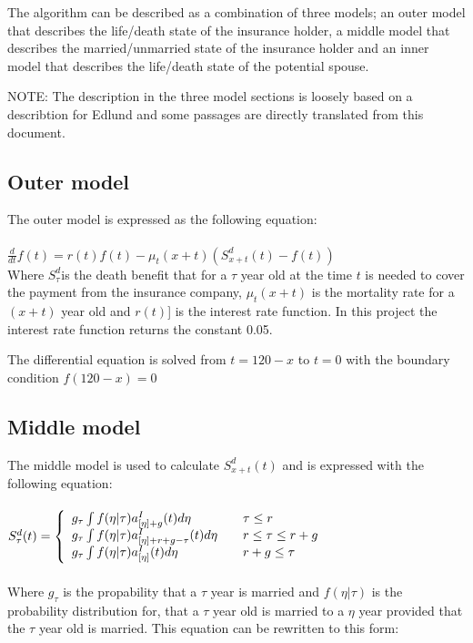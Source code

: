 The algorithm can be described as a combination of three models; an outer model that describes the life/death state of the insurance holder, a middle model that describes the married/unmarried state of the insurance holder and an inner model that describes the life/death state of the potential spouse.

NOTE: The description in the three model sections is loosely based on a describtion for Edlund\cite{edlu} and some passages are directly translated from this document.

\subsection{Outer model}
The outer model is expressed as the following equation:
\\ \\$\frac{d}{dt} f(t) = r(t) f(t) - \mu_t(x+t) (S_{x+t}^d (t) - f(t))$ \\

Where $S_\tau^d$is the death benefit that for a $\tau$ year old at the time $t$ is needed to cover the payment from the insurance company, $\mu_t(x+t)$ is the mortality rate for a $(x + t)$ year old and $r(t)$] is the interest rate function. In this project the interest rate function returns the constant 0.05.

The differential equation is solved from $t=120-x$ to $t=0$ with the boundary condition $f(120-x)=0$

\subsection{Middle model}
The middle model is used to calculate $S_{x+t}^d (t)$ and is expressed with the following equation: \\ \\
$S_\tau^d(t) = \left\{ 
  \begin{array}{l l}
    	g_\tau \int	f(\eta|\tau)a_{[\eta] + g}^I(t)d\eta									& \quad \text{$\tau \le r$}\\
    	g_\tau \int	f(\eta|\tau)a_{[\eta] + r + g - \tau}^I(t)d\eta 			& \quad \text{$r \leq \tau \le r + g$}\\
			g_\tau \int	f(\eta|\tau)a_{[\eta]}^I(t)d\eta 											& \quad \text{$r +g \leq \tau$}
  \end{array} \right.$ \\ \\

Where $g_\tau$ is the propability that a $\tau$ year is married and $f(\eta|\tau)$ is the probability distribution for, that a $\tau$ year old is married to a $\eta$ year provided that the $\tau$ year old is married.
This equation can be rewritten to this form: \\

